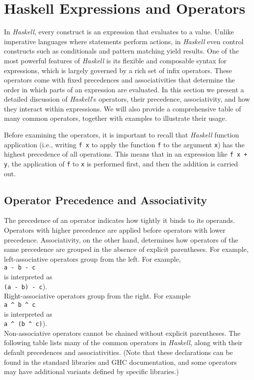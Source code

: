 \section{Haskell Expressions and Operators}
In \textsl{Haskell}, every construct is an expression that evaluates to a value. Unlike imperative languages where
statements perform actions, in \textsl{Haskell} even control constructs such as conditionals and pattern matching yield
results. One of the most powerful features of \textsl{Haskell} is its flexible and composable syntax for expressions,
which is largely governed by a rich set of infix operators. These operators come with fixed precedences and
associativities that determine the order in which parts of an expression are evaluated. In this section we
present a detailed discussion of \textsl{Haskell}’s operators, their precedence, associativity, and how they interact
within expressions. We will also provide a comprehensive table of many common operators, together with examples
to illustrate their usage.  

Before examining the operators, it is important to recall that \textsl{Haskell} function application (i.e., writing
\texttt{f x} to apply the function \texttt{f} to the argument \texttt{x}) has the highest precedence of all
operations. This means that in an expression like \texttt{f x + y}, the application of \texttt{f} to \texttt{x}
is performed first, and then the addition is carried out.

\subsection*{Operator Precedence and Associativity}
The precedence of an operator indicates how tightly it binds to its operands. Operators with higher precedence
are applied before operators with lower precedence. Associativity, on the other hand, determines how operators
of the same precedence are grouped in the absence of explicit parentheses. For example, left-associative
operators group from the left.  For example,
\\[0.2cm]
\hspace*{1.3cm}
\texttt{a - b - c}
\\[0.2cm]
is interpreted as
\\[0.2cm]
\hspace*{1.3cm}
\texttt{(a - b) - c}). 
\\[0.2cm]
Right-associative operators group from the right.  For example
\\[0.2cm]
\hspace*{1.3cm}
\texttt{a \^{ } b \^{ } c}
\\[0.2cm]
is interpreted as
\\[0.2cm]
\hspace*{1.3cm}
\texttt{a \^{ } (b \^{ } c)}).
\\[0.2cm]
Non-associative operators cannot be chained without explicit parentheses. 
The following table lists many of the common operators in \textsl{Haskell}, along with their default precedences and
associativities. (Note that these declarations can be found in the standard libraries and GHC documentation,
and some operators may have additional variants defined by specific libraries.) 
\bigskip

